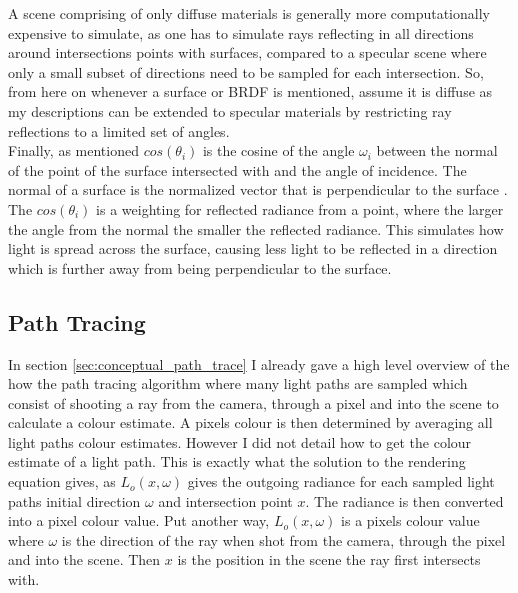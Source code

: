 \documentclass[ %
                    author={Callum Pearce},
                supervisor={Dr. Neill Campbell},
                    degree={MEng},
                     title={How effective are Temporal difference learning methods for reducing the number of zero contribution light paths, while still accurately approximating Global Illumination in Path tracing?},
                  subtitle={},
                      type={research},
                      year={2019} ]{dissertation}
\begin{document}
A scene comprising of only diffuse materials is generally more computationally expensive to simulate, as one has to simulate rays reflecting in all directions around intersections points with surfaces, compared to a specular scene where only a small subset of directions need to be sampled for each intersection. So, from here on whenever a surface or BRDF is mentioned, assume it is diffuse as my descriptions can be extended to specular materials by restricting ray reflections to a limited set of angles.\\

Finally, as mentioned $cos(\theta_i)$ is the cosine of the angle $\omega_i$ between the normal of the point of the surface intersected with and the angle of incidence. The normal of a surface is the normalized vector that is perpendicular to the surface \cite{normals}. The $cos(\theta_i)$ is a weighting for reflected radiance from a point, where the larger the angle from the normal the smaller the reflected radiance. This simulates how light is spread across the surface, causing less light to be reflected in a direction which is further away from being perpendicular to the surface.

\subsection{Path Tracing}

In section \ref{sec:conceptual_path_trace} I already gave a high level overview of the how the path tracing algorithm where many light paths are sampled which consist of shooting a ray from the camera, through a pixel and into the scene to calculate a colour estimate. A pixels colour is then determined by averaging all light paths colour estimates. However I did not detail how to get the colour estimate of a light path. This is exactly what the solution to the rendering equation gives, as $L_o(x,\omega)$ gives the outgoing radiance for each sampled light paths initial direction $\omega$ and intersection point $x$. The radiance is then converted into a pixel colour value. Put another way, $L_o(x,\omega)$ is a pixels colour value where $\omega$ is the direction of the ray when shot from the camera, through the pixel and into the scene. Then $x$ is the position in the scene the ray first intersects with. \\
\end{document}
